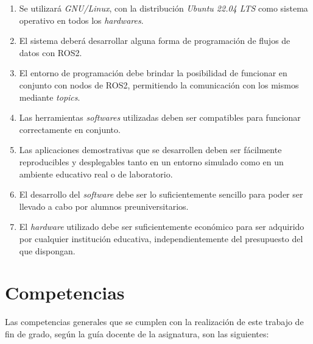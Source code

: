 \begin{enumerate}
    \item{Se utilizará \textit{GNU/Linux}, con la distribución
        \textit{Ubuntu 22.04 LTS} como sistema operativo en todos los
        \textit{hardwares}.}
    \item{El sistema deberá desarrollar alguna forma de programación de flujos
        de datos con ROS2.}
    \item{El entorno de programación debe brindar la posibilidad de funcionar en
        conjunto con nodos de ROS2, permitiendo la comunicación con los mismos
        mediante \textit{topics}.}
    \item{Las herramientas \textit{softwares} utilizadas deben ser compatibles
        para funcionar correctamente en conjunto.}
    \item{Las aplicaciones demostrativas que se desarrollen deben ser fácilmente
        reproducibles y desplegables tanto en un entorno simulado como en un
        ambiente educativo real o de laboratorio.}
    \item{El desarrollo del \textit{software} debe ser lo suficientemente
        sencillo para poder ser llevado a cabo por alumnos preuniversitarios.}
    \item{El \textit{hardware} utilizado debe ser suficientemente económico para
        ser adquirido por cualquier institución educativa, independientemente
        del presupuesto del que dispongan.}
\end{enumerate}



\section{Competencias}
\label{sec:requisitos}

Las competencias generales que se cumplen con la realización de este trabajo de
fin de grado, según la guía docente de la asignatura, son las siguientes:

